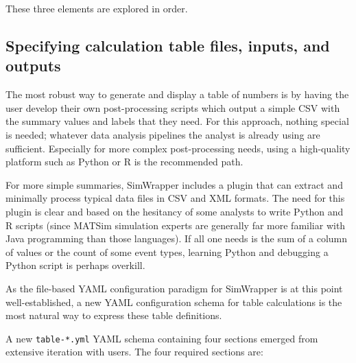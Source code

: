 These three elements are explored in order.


\hypertarget{simwrapper-calculation-tables-definition}{%
\subsection{Specifying calculation table files, inputs, and outputs }\label{calculation-tables-definition}}

The most robust way to generate and display a table of numbers is by having the user develop their own post-processing scripts which output a simple CSV with the summary values and labels that they need. For this approach, nothing special is needed; whatever data analysis pipelines the analyst is already using are sufficient. Especially for more complex post-processing needs, using a high-quality platform such as Python or R is the recommended path.

For more simple summaries, SimWrapper includes a plugin that can extract and minimally process typical data files in CSV and XML formats. The need for this plugin is clear and based on the hesitancy of some analysts to write Python and R scripts (since MATSim simulation experts are generally far more familiar with Java programming than those languages). If all one needs is the sum of a column of values or the count of some event types, learning Python and debugging a Python script is perhaps overkill.

As the file-based YAML configuration paradigm for SimWrapper is at this point well-established, a new YAML configuration schema for table calculations is the most natural way to express these table definitions.

A new \texttt{table-*.yml} YAML schema containing four sections emerged from extensive iteration with users. The four required sections are:

